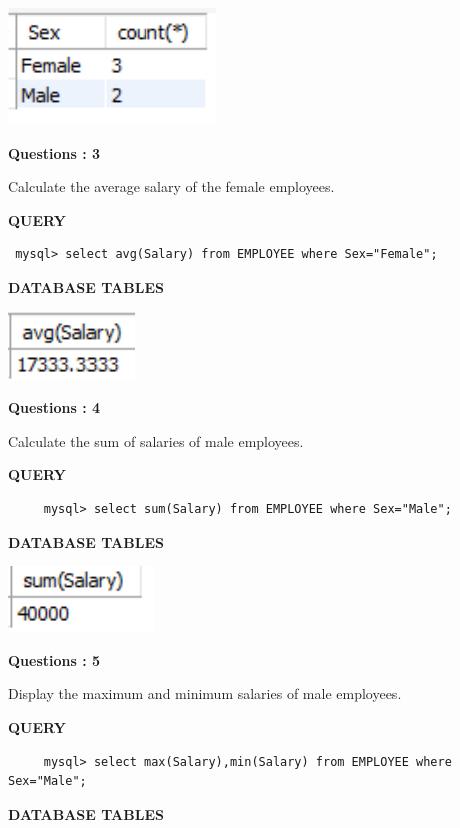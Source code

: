 \documentclass[a4paper,12pt]{report}
\begin{document}
\includegraphics[scale=1.2]{Q2.png}
\begin{flushleft}
    \textbf{Questions : 3}
\end{flushleft}
Calculate the average salary of  the  female employees.
	\begin{flushleft}
		\textbf{QUERY }
	\end{flushleft}
 \begin{verbatim}
 mysql> select avg(Salary) from EMPLOYEE where Sex="Female";    
 \end{verbatim}
\begin{flushleft}
		\textbf{DATABASE TABLES} 
\end{flushleft} 

\includegraphics[scale=1.2]{Q3.png}
\begin{flushleft}
    \textbf{Questions : 4}
\end{flushleft}
Calculate the sum of salaries of male employees.
	\begin{flushleft}
		\textbf{QUERY }
	\end{flushleft}
 \begin{verbatim}
     mysql> select sum(Salary) from EMPLOYEE where Sex="Male";
 \end{verbatim}
\begin{flushleft}
		\textbf{DATABASE TABLES} 
\end{flushleft} 

\includegraphics[scale=1.2]{Q4.png}
\begin{flushleft}
    \textbf{Questions : 5}
\end{flushleft}
Display the maximum and minimum salaries of male employees.
	\begin{flushleft}
		\textbf{QUERY }
	\end{flushleft}
 \begin{verbatim}
     mysql> select max(Salary),min(Salary) from EMPLOYEE where Sex="Male";
 \end{verbatim}
\begin{flushleft}
		\textbf{DATABASE TABLES} 
\end{flushleft} 
\end{document}
